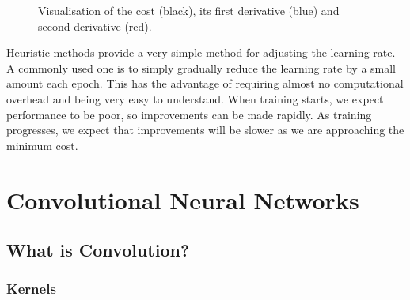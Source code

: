 \begin{figure}
\begin{center}
\caption{Visualisation of the cost (black), its first derivative (blue) and second derivative (red).}
\label{fig:2ndordr}
\end{center}
\end{figure}

Heuristic methods provide a very simple method for adjusting the learning rate. A commonly used one is to simply gradually reduce the learning rate by a small amount each epoch. This has the advantage of requiring almost no computational overhead and being very easy to understand. When training starts, we expect performance to be poor, so improvements can be made rapidly. As training progresses, we expect that improvements will be slower as we are approaching the minimum cost.

\section{Convolutional Neural Networks}
\subsection{What is Convolution?}
\subsubsection{Kernels}
